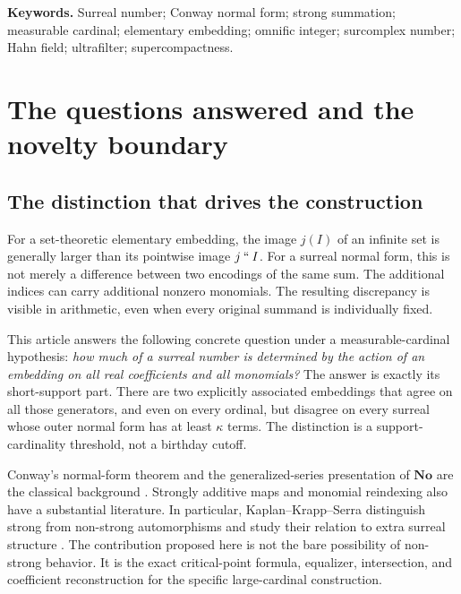 \documentclass[11pt,letterpaper]{article}
\numberwithin{equation}{section}
\theoremstyle{definition}
\theoremstyle{remark}
\newcommand{\No}{\mathbf{No}}
\newcommand{\imset}[2]{#1\mathbin{``}#2}
\begin{document}
\vspace{4pt}
\noindent\textbf{Keywords.} Surreal number; Conway normal form; strong summation;
measurable cardinal; elementary embedding; omnific integer; surcomplex number;
Hahn field; ultrafilter; supercompactness.
\begingroup
\small
\setlength{\parskip}{0pt}
\tableofcontents
\endgroup
\clearpage
{}

\section{The questions answered and the novelty boundary}\label{lce:sec:intro}

\subsection{The distinction that drives the construction}
For a set-theoretic elementary embedding, the image $j(I)$ of an infinite set
is generally larger than its pointwise image $\imset jI$. For a surreal
normal form, this is not merely a difference between two encodings of the
same sum. The additional indices can carry additional nonzero monomials.
The resulting discrepancy is visible in arithmetic, even when every original
summand is individually fixed.

This article answers the following concrete question under a measurable-cardinal
hypothesis: \emph{how much of a surreal number is determined by the action of
an embedding on all real coefficients and all monomials?} The answer is
exactly its short-support part. There are two explicitly associated embeddings
that agree on all those generators, and even on every ordinal, but disagree
on every surreal whose outer normal form has at least $\kappa$ terms.
The distinction is a support-cardinality threshold, not a birthday cutoff.

Conway's normal-form theorem and the generalized-series presentation of
$\No$ are the classical background \cite{Conway,Gonshor,vdDE,EhrlichNames}.
Strongly additive maps and monomial reindexing also have a substantial
literature. In particular, Kaplan--Krapp--Serra distinguish strong from
non-strong automorphisms and study their relation to extra surreal structure
\cite{KKS}. The contribution proposed here is not the bare possibility of
non-strong behavior. It is the exact critical-point formula, equalizer,
intersection, and coefficient reconstruction for the specific large-cardinal
construction.
\end{document}
